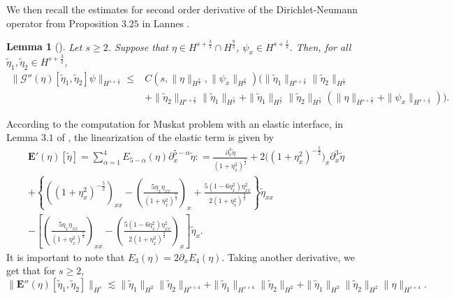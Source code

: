 \documentclass[12pt]{amsart}
\newtheorem{lemma}[theorem]{Lemma}
\theoremstyle{remark}
\theoremstyle{definition}
\numberwithin{equation}{section}
\newcommand{\p}{\partial}
\newcommand{\al}{\alpha}
\newcommand{\f}{\frac}
\begin{document}
We then recall the estimates for second order derivative of the Dirichlet-Neumann operator from Proposition $3.25$ in Lannes \cite{MR2138139}.

\begin{lemma} [\hspace{1sp}\cite{MR2138139}] \label{t:Lannes}
Let $s\geq2$. Suppose that $\eta\in H^{s+\f32}\cap H^{\f92}$, $\psi_x\in H^{s+\f12}$. Then, for all $\tilde{\eta}_1,\tilde{\eta}_2\in H^{s+\f32}$,
\begin{align*}
\|\mathcal{G}''(\eta)[\tilde{\eta}_1,\tilde{\eta}_2]\psi\|_{H^{s+\f12}}\leq&C\left(s,\|\eta\|_{H^{\f92}},\|\psi_x\|_{H^{\f32}}\right)\Big(\|\tilde{\eta}_1\|_{H^{s+\f32}}\|\tilde{\eta}_2\|_{H^{\f52}}\\
&+\|\tilde{\eta}_2\|_{H^{s+\f32}}\|\tilde{\eta}_1\|_{H^{\f52}}+\|\tilde{\eta}_1\|_{H^{\f52}}\|\tilde{\eta}_2\|_{H^{\f52}}\left(\|\eta\|_{H^{s+\f32}}+\|\psi_x\|_{H^{s+\f12}}\right)\Big).
\end{align*}
\end{lemma}

According to the computation for Muskat problem with an elastic interface, in Lemma $3.1$ of \cite{WanY26}, the linearization of the elastic term is given by 
\begin{align*}
&\mathbf{E}'(\eta)[\tilde{\eta}]= \sum _{\al = 1}^4 E_{5-\al}(\eta)\p_x^{5-\al}\tilde{\eta} : = 
\f{\p_x^4\tilde{\eta}}{(1+\eta^2_x)^{\f52}}+2\big((1+\eta^2_x)^{-\f52}\big)_x\p^3_x\tilde{\eta}\\
&+\left\{((1+\eta^2_x)^{-\f52})_{xx}-\left(\f{5\eta_x\eta_{xx}}{(1+\eta_x^2)^{\f72}}\right)_x+\f{5(1-6\eta_x^2)\eta^2_{xx}}{2(1+\eta_x^2)^{\f92}}\right\}\tilde{\eta}_{xx}\\
&-\left[\left(\f{5\eta_x\eta_{xx}}{(1+\eta_x^2)^{\f72}}\right)_{xx}-\left(\f{5(1-6\eta_x^2)\eta^2_{xx}}{2(1+\eta_x^2)^{\f92}}\right)_x\right]\tilde{\eta}_{x}.
\end{align*}
It is important to note that $E_3(\eta) = 2 \p_x E_4(\eta)$.
Taking another derivative, we get that for $s \geq 2$,
\begin{equation} \label{SecondElastic}
 \|\mathbf{E}''(\eta)[\tilde{\eta}_1, \tilde{\eta}_2]\|_{H^s} \lesssim \|\tilde{\eta}_1 \|_{H^2}\|\tilde{\eta}_2 \|_{H^{s+4}} + \|\tilde{\eta}_1 \|_{H^{s+4}}\|\tilde{\eta}_2 \|_{H^2} + \|\tilde{\eta}_1 \|_{H^2}\|\tilde{\eta}_2 \|_{H^{2}} \|\eta\|_{H^{s+4}}.
\end{equation}
\end{document}
